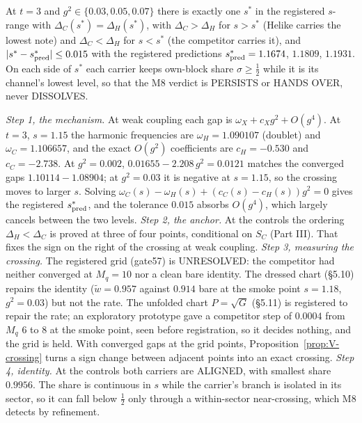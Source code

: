 \begin{conjecture}\label{conj:V-switch}
At $t=3$ and $g^2\in\{0.03,0.05,0.07\}$ there is exactly one $s^*$ in the registered $s$-range with
$\Delta_C(s^*)=\Delta_H(s^*)$, with $\Delta_C>\Delta_H$ for $s>s^*$ (Helike carries the lowest note) and
$\Delta_C<\Delta_H$ for $s<s^*$ (the competitor carries it), and $|s^*-s^*_{\rm pred}|\leq0.015$ with the registered
predictions $s^*_{\rm pred}=1.1674$, $1.1809$, $1.1931$. On each side of $s^*$ each carrier keeps own-block share
$\sigma\geq\frac12$ while it is its channel's lowest level, so that the M8 verdict is PERSISTS or HANDS OVER, never
DISSOLVES.
\end{conjecture}
\begin{sketch}
\emph{Step 1, the mechanism.} At weak coupling each gap is $\omega_X+c_Xg^2+O(g^4)$. At $t=3$, $s=1.15$ the harmonic
frequencies are $\omega_H=1.090107$ (doublet) and $\omega_C=1.106657$, and the exact $O(g^2)$ coefficients are
$c_H=-0.530$ and $c_C=-2.738$. At $g^2=0.002$, $0.01655-2.208\,g^2=0.0121$ matches the converged gaps $1.10114-1.08904$; at
$g^2=0.03$ it is negative at $s=1.15$, so the crossing moves to larger $s$. Solving
$\omega_C(s)-\omega_H(s)+(c_C(s)-c_H(s))g^2=0$ gives the registered $s^*_{\rm pred}$, and the tolerance $0.015$
absorbs $O(g^4)$, which largely cancels between the two levels.
\emph{Step 2, the anchor.} At the controls the ordering $\Delta_H<\Delta_C$ is proved at three of four points,
conditional on $S_C$ (Part III). That fixes the sign on the right of the crossing at weak coupling.
\emph{Step 3, measuring the crossing.} The registered grid (gate57) is UNRESOLVED: the competitor had neither
converged at $M_q=10$ nor a clean bare identity. The dressed chart (\S5.10) repairs the identity
($\tilde w=0.957$ against $0.914$ bare at the smoke point $s=1.18$, $g^2=0.03$) but not the rate. The unfolded chart
$P=\sqrt G$ (\S5.11) is registered to repair the rate; an exploratory prototype gave a competitor step of $0.0004$ from
$M_q$ 6 to 8 at the smoke point, seen before registration, so it decides nothing, and the grid is held. With converged
gaps at the grid points,
Proposition~\ref{prop:V-crossing} turns a sign change between adjacent points into an exact crossing.
\emph{Step 4, identity.} At the controls both carriers are ALIGNED, with smallest share $0.9956$. The share is
continuous in $s$ while the carrier's branch is isolated in its sector, so it can fall below $\frac12$ only through a
within-sector near-crossing, which M8 detects by refinement.

\end{sketch}
